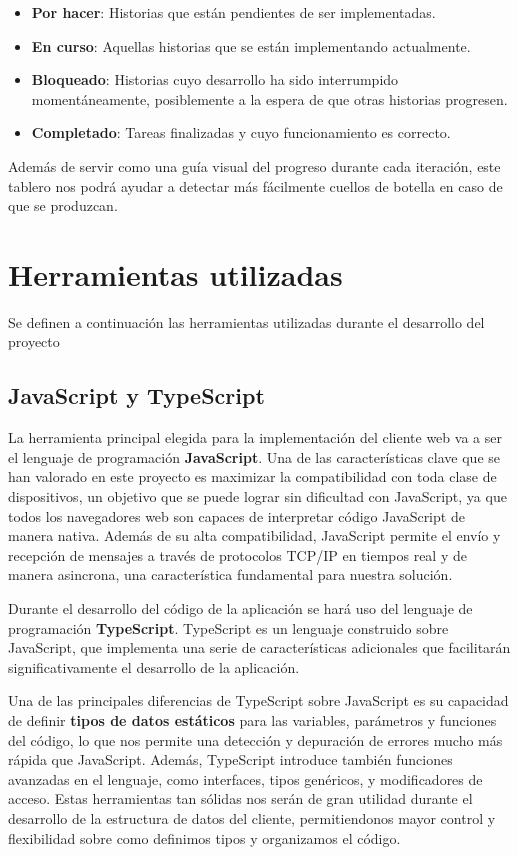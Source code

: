 \begin{itemize}
	\item \textbf{Por hacer}: Historias que están pendientes de ser implementadas.
	\item \textbf{En curso}: Aquellas historias que se están implementando actualmente. 
	\item \textbf{Bloqueado}: Historias cuyo desarrollo ha sido interrumpido momentáneamente, posiblemente a la espera de que otras historias progresen. 
	\item \textbf{Completado}: Tareas finalizadas y cuyo funcionamiento es correcto.
\end{itemize}

Además de servir como una guía visual del progreso durante cada iteración, este tablero nos podrá ayudar a detectar más fácilmente cuellos de botella en caso de que se produzcan.

\section{Herramientas utilizadas}

Se definen a continuación las herramientas utilizadas durante el desarrollo del proyecto

\subsection{JavaScript y TypeScript}

La herramienta principal elegida para la implementación del cliente web va a ser el lenguaje de programación \textbf{JavaScript}\cite{npm}. Una de las características clave que se han valorado en este proyecto es maximizar la compatibilidad con toda clase de dispositivos, un objetivo que se puede lograr sin dificultad con JavaScript, ya que todos los navegadores web son capaces de interpretar código JavaScript de manera nativa. Además de su alta compatibilidad, JavaScript permite el envío y recepción de mensajes a través de protocolos TCP/IP en tiempos real y de manera asincrona, una característica fundamental para nuestra solución.
 
Durante el desarrollo del código de la aplicación se hará uso del lenguaje de programación \textbf{TypeScript}. TypeScript es un lenguaje construido sobre JavaScript, que implementa una serie de características adicionales que facilitarán significativamente el desarrollo de la aplicación.\cite{typescript}

Una de las principales diferencias de  TypeScript sobre JavaScript es su capacidad de definir \textbf{tipos de datos estáticos} para las variables, parámetros y funciones del código, lo que nos permite una detección y depuración de errores mucho más rápida que JavaScript. Además, TypeScript introduce también funciones avanzadas en el lenguaje, como interfaces, tipos genéricos, y modificadores de acceso. Estas herramientas tan sólidas nos serán de gran utilidad durante el desarrollo de la estructura de datos del cliente, permitiendonos mayor control y flexibilidad sobre como definimos tipos y organizamos el código.

